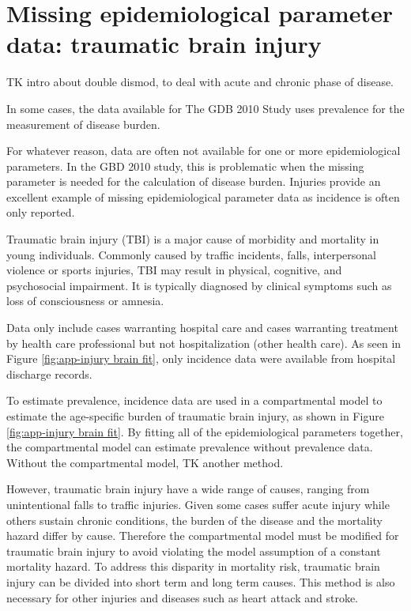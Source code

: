\chapter{Missing epidemiological parameter data: traumatic brain injury}
\label{applications-double_dismod}

TK intro about double dismod, to deal with acute and chronic phase of disease.

In some cases, the data available for The GDB 2010 Study uses
prevalence for the measurement of disease burden.

For whatever reason, data are often not available for one or more
epidemiological parameters.  In the GBD 2010 study, this is
problematic when the missing parameter is needed for the calculation
of disease burden.  Injuries provide an excellent example of missing
epidemiological parameter data as incidence is often only reported.

Traumatic brain injury (TBI) is a major cause of morbidity and 
mortality in young individuals. Commonly caused by traffic
incidents, falls, interpersonal violence or sports injuries, 
TBI may result in physical, cognitive, and psychosocial impairment.
It is typically diagnosed by clinical symptoms such as loss of 
consciousness or amnesia. \cite{maas_moderate_2008, nih_rehabilitation_1999,
bruns_epidemiology_2003}

Data only include cases warranting hospital care and cases warranting
treatment by health care professional but not hospitalization (other
health care).  As seen in Figure \ref{fig:app-injury brain fit},
only incidence data were available from hospital discharge records.

To estimate prevalence, incidence data are used in a compartmental model to estimate the
age-specific burden of traumatic brain injury, as shown in Figure
\ref{fig:app-injury brain fit}.  By fitting all of the epidemiological
parameters together, the compartmental model can estimate prevalence
without prevalence data.  Without the compartmental model, TK another method.

However, traumatic brain injury have a wide range of
causes, ranging from unintentional falls to traffic injuries.
Given some cases suffer acute injury while others sustain
chronic conditions, the burden of the disease and the mortality hazard
differ by cause.  Therefore the compartmental model must be modified
for traumatic brain injury to avoid violating the model assumption of a
constant mortality hazard.  To address this disparity in mortality
risk, traumatic brain injury can be divided into short term and long term
causes.  This method is also necessary for other injuries and
diseases such as heart attack and stroke.

